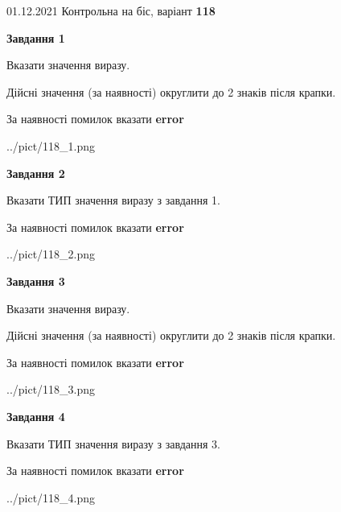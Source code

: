 \documentclass[11pt, ukrainian]{article}
\begin{document}
{01.12.2021 Контрольна на біс, варіант  \No \textbf { 118 }\par}
{
\begin {large}
{\begin {center}\textbf{Завдання 1}\end {center}}\par
Вказати значення виразу. \par
Дійсні значення (за наявності) округлити до 2 знаків після крапки. \par
За наявності помилок вказати \textbf{error}

\begin{center}
	{../pict/118_1.png}
\end{center}
\newpage

{\begin {center}\textbf{Завдання 2}\end {center}}\par
Вказати ТИП значення виразу з завдання 1. \par
За наявності помилок вказати \textbf{error}

\begin{center}
	{../pict/118_2.png}
\end{center}
\newpage

{\begin {center}\textbf{Завдання 3}\end {center}}\par
Вказати значення виразу. \par
Дійсні значення (за наявності) округлити до 2 знаків після крапки. \par
За наявності помилок вказати \textbf{error}

\begin{center}
	{../pict/118_3.png}
\end{center}
\newpage

{\begin {center}\textbf{Завдання 4}\end {center}}\par
Вказати ТИП значення виразу з завдання 3. \par
За наявності помилок вказати \textbf{error}

\begin{center}
	{../pict/118_4.png}
\end{center}
\newpage


\end{large}}
\end{document}
